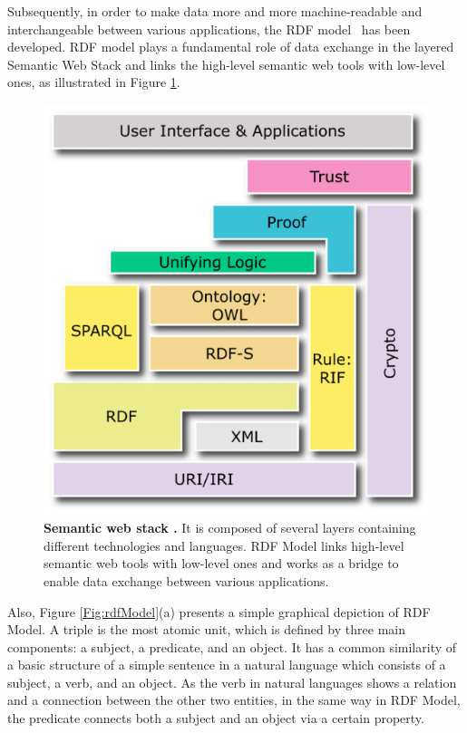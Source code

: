 Subsequently, in order to make data more and more machine-readable and interchangeable between various applications, the RDF model~\cite{W3C:RDF-Primer:Online} has been developed.  
RDF model plays a fundamental role of data exchange in the layered Semantic Web Stack and links the high-level semantic web tools with low-level ones, as illustrated in {Figure \ref{Fig:semanticWebStack}}. 
	\begin{figure}[ht]
	\begin{center}
	\setlength\belowcaptionskip{-7mm}
		\includegraphics[scale=0.5,angle=0]{images/semanticWebStack}
		\caption{\textbf{Semantic web stack \cite{W3C:SemanticStack:Online}.} It is composed of several layers containing different technologies and languages. 
		RDF Model links high-level semantic web tools with low-level ones and works as a bridge to enable data exchange between various applications.}
		\label{Fig:semanticWebStack}
	\end{center}
\end{figure}
\par
Also, {Figure \ref{Fig:rdfModel}}(a) presents a simple graphical depiction of RDF Model. 
A triple is the most atomic unit, which is defined by three main components: a subject, a predicate, and an object. 
It has a common similarity of a basic structure of a simple sentence in a natural language which consists of a subject, a verb, and an object. 
As the verb in natural languages shows a relation and a connection between the other two entities, in the same way in RDF Model, the predicate connects both a subject and an object via a certain property. 

